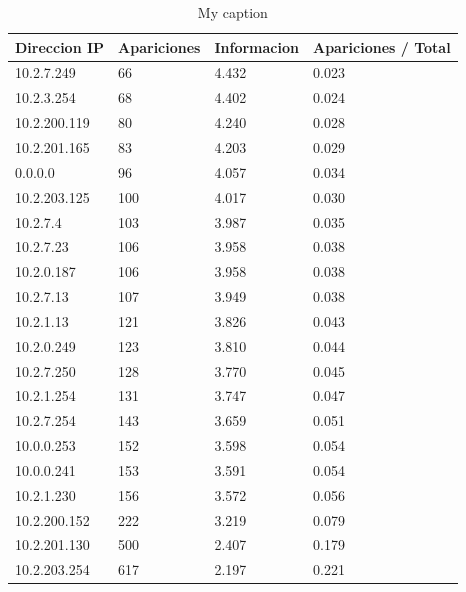 \begin{table}[H]
\centering
\caption{My caption}
\label{my-label}
\begin{tabular}{@{}llll@{}}
\toprule
Direccion IP & Apariciones & Informacion        & Apariciones / Total \\ \midrule
10.2.7.249   & 66          & 4.432   & 0.023               \\
10.2.3.254   & 68          & 4.402  & 0.024               \\
10.2.200.119 & 80          & 4.240  & 0.028               \\
10.2.201.165 & 83          & 4.203  & 0.029               \\
0.0.0.0      & 96          & 4.057  & 0.034               \\
10.2.203.125 & 100         & 4.017  & 0.030               \\
10.2.7.4     & 103         & 3.987  & 0.035               \\
10.2.7.23    & 106         & 3.958 & 0.038               \\
10.2.0.187   & 106         & 3.958 & 0.038               \\
10.2.7.13    & 107         & 3.949 & 0.038               \\
10.2.1.13    & 121         & 3.826  & 0.043               \\
10.2.0.249   & 123         & 3.810 & 0.044               \\
10.2.7.250   & 128         & 3.770 & 0.045               \\
10.2.1.254   & 131         & 3.747 & 0.047               \\
10.2.7.254   & 143         & 3.659 & 0.051               \\
10.0.0.253   & 152         & 3.598 & 0.054               \\
10.0.0.241   & 153         & 3.591  & 0.054               \\
10.2.1.230   & 156         & 3.572  & 0.056               \\
10.2.200.152 & 222         & 3.219 & 0.079               \\
10.2.201.130 & 500         & 2.407  & 0.179               \\
10.2.203.254 & 617         & 2.197 & 0.221               \\ \bottomrule
\end{tabular}
\end{table}


